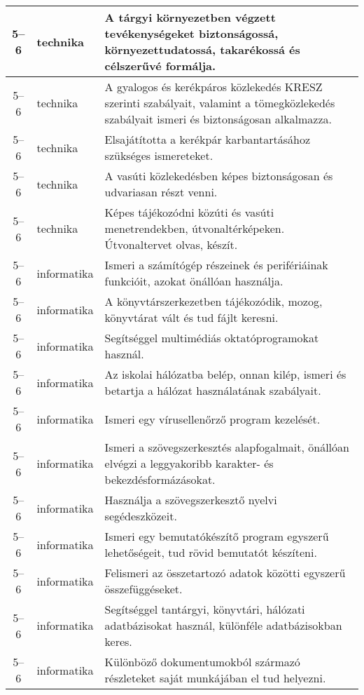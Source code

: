 \begin{small}
\begin{longtable}{c | p{2cm} |  p{11cm} }
              5--6 & technika & A tárgyi környezetben végzett tevékenységeket biztonságossá, környezettudatossá, takarékossá és célszerűvé formálja. \\ \hline
              5--6 & technika & A gyalogos és kerékpáros közlekedés KRESZ szerinti szabályait, valamint a tömegközlekedés szabályait ismeri és biztonságosan alkalmazza. \\ \hline
              5--6 & technika & Elsajátította a kerékpár karbantartásához szükséges ismereteket. \\ \hline
              5--6 & technika & A vasúti közlekedésben képes biztonságosan és udvariasan részt venni. \\ \hline
              5--6 & technika & Képes tájékozódni közúti és vasúti menetrendekben, útvonaltérképeken. Útvonaltervet olvas, készít. \\ \hline
              5--6 & informatika & Ismeri a számítógép részeinek és perifériáinak funkcióit, azokat önállóan használja. \\ \hline
              5--6 & informatika & A könyvtárszerkezetben tájékozódik, mozog, könyvtárat vált és tud fájlt keresni. \\ \hline
              5--6 & informatika & Segítséggel multimédiás oktatóprogramokat használ. \\ \hline
              5--6 & informatika & Az iskolai hálózatba belép, onnan kilép, ismeri és betartja a hálózat használatának szabályait. \\ \hline
              5--6 & informatika & Ismeri egy vírusellenőrző program kezelését. \\ \hline
              5--6 & informatika & Ismeri a szövegszerkesztés alapfogalmait, önállóan elvégzi a leggyakoribb karakter- és bekezdésformázásokat. \\ \hline
              5--6 & informatika & Használja a szövegszerkesztő nyelvi segédeszközeit. \\ \hline
              5--6 & informatika & Ismeri egy bemutatókészítő program egyszerű lehetőségeit, tud rövid bemutatót készíteni. \\ \hline
              5--6 & informatika & Felismeri az összetartozó adatok közötti egyszerű összefüggéseket. \\ \hline
              5--6 & informatika & Segítséggel tantárgyi, könyvtári, hálózati adatbázisokat használ, különféle adatbázisokban keres. \\ \hline
              5--6 & informatika & Különböző dokumentumokból származó részleteket saját munkájában el tud helyezni. \\ \hline

\end{longtable}
\end{small}
